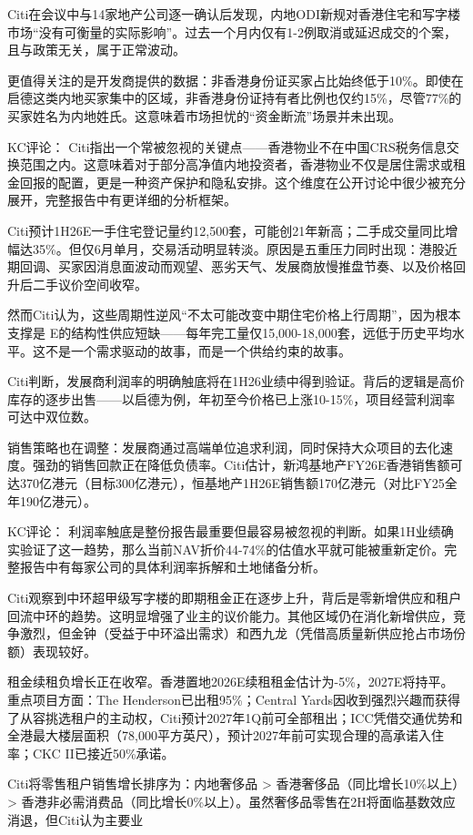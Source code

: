 \documentclass[11pt]{ctexart}
\begin{document}
Citi在会议中与14家地产公司逐一确认后发现，内地ODI新规对香港住宅和写字楼市场“没有可衡量的实际影响”。过去一个月内仅有1-2例取消或延迟成交的个案，且与政策无关，属于正常波动。

更值得关注的是开发商提供的数据：非香港身份证买家占比始终低于10\%。即使在启德这类内地买家集中的区域，非香港身份证持有者比例也仅约15\%，尽管77\%的买家姓名为内地姓氏。这意味着市场担忧的“资金断流”场景并未出现。

KC评论： Citi指出一个常被忽视的关键点——香港物业不在中国CRS税务信息交换范围之内。这意味着对于部分高净值内地投资者，香港物业不仅是居住需求或租金回报的配置，更是一种资产保护和隐私安排。这个维度在公开讨论中很少被充分展开，完整报告中有更详细的分析框架。

Citi预计1H26E一手住宅登记量约12,500套，可能创21年新高；二手成交量同比增幅达35\%。但仅6月单月，交易活动明显转淡。原因是五重压力同时出现：港股近期回调、买家因消息面波动而观望、恶劣天气、发展商放慢推盘节奏、以及价格回升后二手议价空间收窄。

然而Citi认为，这些周期性逆风“不太可能改变中期住宅价格上行周期”，因为根本支撑是 E的结构性供应短缺——每年完工量仅15,000-18,000套，远低于历史平均水平。这不是一个需求驱动的故事，而是一个供给约束的故事。

Citi判断，发展商利润率的明确触底将在1H26业绩中得到验证。背后的逻辑是高价库存的逐步出售——以启德为例，年初至今价格已上涨10-15\%，项目经营利润率可达中双位数。

销售策略也在调整：发展商通过高端单位追求利润，同时保持大众项目的去化速度。强劲的销售回款正在降低负债率。Citi估计，新鸿基地产FY26E香港销售额可达370亿港元（目标300亿港元），恒基地产1H26E销售额170亿港元（对比FY25全年190亿港元）。

KC评论： 利润率触底是整份报告最重要但最容易被忽视的判断。如果1H业绩确实验证了这一趋势，那么当前NAV折价44-74\%的估值水平就可能被重新定价。完整报告中有每家公司的具体利润率拆解和土地储备分析。

Citi观察到中环超甲级写字楼的即期租金正在逐步上升，背后是零新增供应和租户回流中环的趋势。这明显增强了业主的议价能力。其他区域仍在消化新增供应，竞争激烈，但金钟（受益于中环溢出需求）和西九龙（凭借高质量新供应抢占市场份额）表现较好。

租金续租负增长正在收窄。香港置地2026E续租租金估计为-5\%，2027E将持平。重点项目方面：The Henderson已出租95\%；Central Yards因收到强烈兴趣而获得了从容挑选租户的主动权，Citi预计2027年1Q前可全部租出；ICC凭借交通优势和全港最大楼层面积（78,000平方英尺），预计2027年前可实现合理的高承诺入住率；CKC II已接近50\%承诺。

Citi将零售租户销售增长排序为：内地奢侈品 > 香港奢侈品（同比增长10\%以上） > 香港非必需消费品（同比增长0\%以上）。虽然奢侈品零售在2H将面临基数效应消退，但Citi认为主要业
\end{document}
